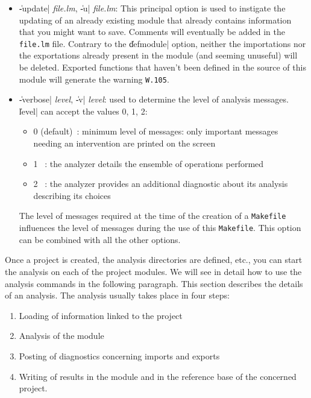 \begin{itemize}
\item {\Large \|-update| {\em file.lm}, \|-u| {\em file.lm}}:
This principal option is used to instigate the updating of an already existing module that already contains information that you might want to save.
Comments will eventually be added in the {\tt file.lm} file. Contrary to the \|defmodule| option, neither the importations nor the exportations already present in the module (and seeming unuseful) will be deleted.
Exported functions that haven't been defined in the source of this module will generate the warning {\tt W.105}. 

\item {\Large \|-verbose| {\em level}, \|-v| {\em level}}:  used to determine the level of analysis messages.  \|level| can accept the values 0, 1, 2:  
\begin{itemize}
\item 0 (default)\ :
minimum level of messages:  only important messages needing an intervention are printed on the screen
\item 1 \ :
the analyzer details the ensemble of operations performed
\item 2 \ :
the analyzer provides an additional diagnostic about its analysis describing its choices
\end{itemize}
The level of messages required at the time of the creation of a {\tt Makefile} influences the level of messages during the use of this {\tt Makefile}.  This option can be combined with all the other options. 

\end{itemize}


Once a project is created, the analysis directories are defined, etc., you can start the analysis on each of the project modules.
We will see in detail how to use the analysis commands in the following paragraph.  This section describes the details of an analysis.  The analysis usually takes place in four steps:

\begin {enumerate}

\item Loading of information linked to the project

\item Analysis of the module

\item Posting of diagnostics concerning imports and exports

\item Writing of results in the module and in the reference base of the concerned project.
\end {enumerate}

